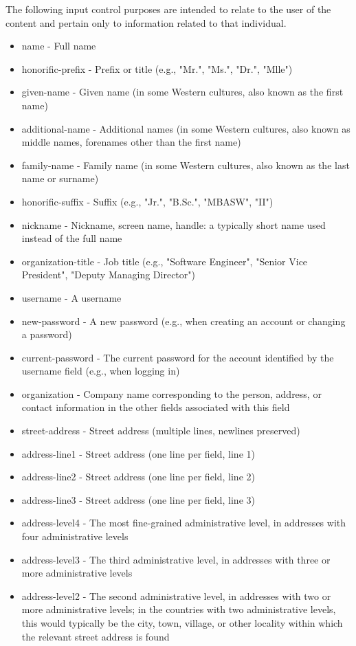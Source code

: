 \noindent The following input control purposes are intended to relate to the user of the content and pertain only to information related to that individual.
\begin{itemize}
\item name - Full name
\item honorific-prefix - Prefix or title (e.g., "Mr.", "Ms.", "Dr.", "Mlle")
\item given-name - Given name (in some Western cultures, also known as the first name)
\item additional-name - Additional names (in some Western cultures, also known as middle names, forenames other than the first name)
\item family-name - Family name (in some Western cultures, also known as the last name or surname)
\item honorific-suffix - Suffix (e.g., "Jr.", "B.Sc.", "MBASW", "II")
\item nickname - Nickname, screen name, handle: a typically short name used instead of the full name
\item organization-title - Job title (e.g., "Software Engineer", "Senior Vice President", "Deputy Managing Director")
\item username - A username
\item new-password - A new password (e.g., when creating an account or changing a password)
\item current-password - The current password for the account identified by the username field (e.g., when logging in)
\item organization - Company name corresponding to the person, address, or contact information in the other fields associated with this field
\item street-address - Street address (multiple lines, newlines preserved)
\item address-line1 - Street address (one line per field, line 1)
\item address-line2 - Street address (one line per field, line 2)
\item address-line3 - Street address (one line per field, line 3)
\item address-level4 - The most fine-grained administrative level, in addresses with four administrative levels
\item address-level3 - The third administrative level, in addresses with three or more administrative levels
\item address-level2 - The second administrative level, in addresses with two or more administrative levels; in the countries with two administrative levels, this would typically be the city, town, village, or other locality within which the relevant street address is found

\end{itemize}
